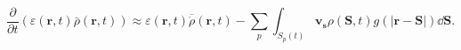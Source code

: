 \begin{equation}
\frac{\partial}{\partial t }\left( \varepsilon (\mathbf{r},t)
\bar{\rho}(\mathbf{r},t) \right)
\approx
\varepsilon (\mathbf{r},t) \overline{\dot{\rho}}(\mathbf{r},t) - 
\sum_{p}{\int_{S_p(t)}{\mathbf{v_s} \rho(\mathbf{S},t) g(|\mathbf{r} - \mathbf{S}|) 
\dd \mathbf{S}}}.
 \label{eq:ddtepsrho}
\end{equation}

